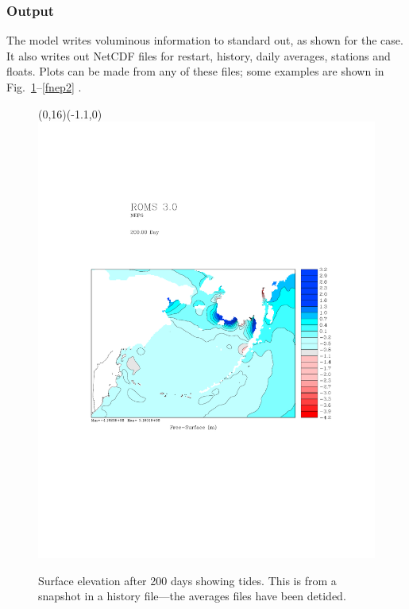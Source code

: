 \subsubsection{Output}
The model writes voluminous information to standard out, as shown
for the  case.
It also writes out NetCDF files for restart, history, daily
averages, stations and floats.  Plots can be made from any of
these files; some examples are shown in Fig.\
\ref{fnep1}--\ref{fnep2} .

\begin{figure}
\setlength{\unitlength}{10mm}
\begin{picture}(0,16)(-1.1,0)
\includegraphics{pics/zeta_NEP5}
  \end{picture}
\caption{Surface elevation after 200 days showing tides. This is
from a snapshot in a history file---the averages files have been
detided.}
\label{fnep1}
\end{figure}

